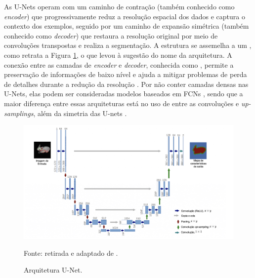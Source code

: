 As U-Nets operam com um caminho de contração (também conhecido como \textit{encoder}) que progressivamente reduz a resolução espacial dos dados e captura o contexto dos exemplos, seguido por um caminho de expansão simétrica (também conhecido como \textit{decoder}) que restaura a resolução original por meio de convoluções transpostas e realiza a segmentação. A estrutura se assemelha a um , como retrata a Figura \ref{semantic:fig:unet}, o que levou à sugestão do nome da arquitetura. A conexão entre as camadas de \textit{encoder} e \textit{decoder}, conhecida como , permite a preservação de informações de baixo nível e ajuda a mitigar problemas de perda de detalhes durante a redução da resolução \citep{Minaee2021, Minaee2021DeepClassification}. Por não conter camadas densas nas U-Nets, elas podem ser consideradas modelos baseados em FCNs \citep{Minaee2021}, sendo que a maior diferença entre essas arquiteturas está no uso de  entre as convoluções e \textit{up-samplings}, além da simetria das U-nets \citep{OZTURK2020ComparisonImageries}.

\begin{figure}[H]
    \centering
    \caption{Arquitetura U-Net.}
    \includegraphics[width=1\linewidth]{recursos/imagens/semantic/unet-arch.png}
    \label{semantic:fig:unet}

    Fonte: retirada e adaptado de \cite{Ronneberger2015U-net:Segmentation}.
\end{figure}

